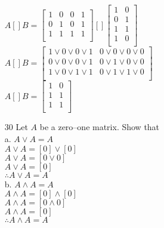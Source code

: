 \documentclass[a4paper]{article}
\newcommand\tab[1][0.5cm]{\hspace*{#1}}
\begin{document}
\begin{itemize}
    \tab $A[] B = \left[\begin{matrix}
      1 & 0 & 0 & 1 \\
      0 & 1 & 0 & 1 \\
      1 & 1 & 1 & 1 \\
    \end{matrix}\right] [] \left[\begin{matrix}
      1 & 0 \\
      0 & 1 \\
      1 & 1 \\
      1 & 0 \\
    \end{matrix}\right]$ \\
    \tab $A[] B = \left[\begin{matrix}
      1 \vee 0 \vee 0 \vee 1 & 0 \vee 0 \vee 0 \vee 0 \\
      0 \vee 0 \vee 0 \vee 1 & 0 \vee 1 \vee 0 \vee 0 \\
      1 \vee 0 \vee 1 \vee 1 & 0 \vee 1 \vee 1 \vee 0 \\
    \end{matrix}\right]$ \\
    \tab $A[] B = \left[\begin{matrix}
      1 & 0 \\
      1 & 1 \\
      1 & 1 \\
    \end{matrix}\right]$
    \item[30] Let $A$ be a zero–one matrix. Show that \\
      a. $A \vee A = A$ \\
      \tab $A \vee A = [0] \vee [0]$ \\
      \tab $A \vee A = [0 \vee 0]$ \\
      \tab $A \vee A = [0]$ \\
      \tab $\therefore A \vee A = A$ \\
      b. $A \wedge A = A$ \\
      \tab $A \wedge A = [0] \wedge [0]$ \\
      \tab $A \wedge A = [0 \wedge 0]$ \\
      \tab $A \wedge A = [0]$ \\
      \tab $\therefore A \wedge A = A$
  \end{itemize}
\end{document}
